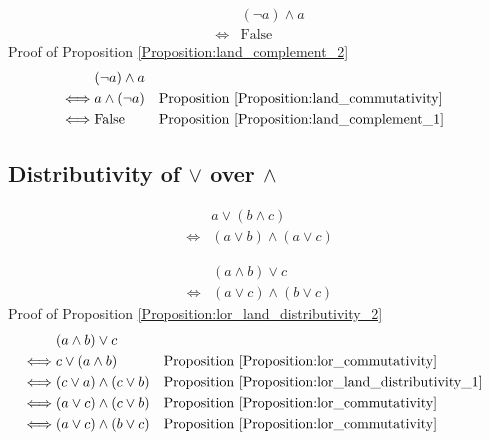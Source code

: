 \begin{prop}
\label{Proposition:land_complement_2}
\begin{align*}
& (\lnot a) \land a \\
\iff & \text{False}
\end{align*}
Proof of Proposition \ref{Proposition:land_complement_2}
\begin{align*}
& (\lnot a) \land a \\
\iff & a \land (\lnot a)
& & \text{Proposition \ref{Proposition:land_commutativity}} \\
\iff & \text{False}
& & \text{Proposition \ref{Proposition:land_complement_1}} \\
\end{align*}
\end{prop}

\subsection{Distributivity of $\lor$ over $\land$}
\begin{prop}
\label{Proposition:lor_land_distributivity_1}
\begin{align*}
& a \lor (b \land c) \\
\iff & (a \lor b) \land (a \lor c)
\end{align*}
\end{prop}

\begin{prop}
\label{Proposition:lor_land_distributivity_2}
\begin{align*}
& (a \land b) \lor c \\
\iff & (a \lor c) \land (b \lor c)
\end{align*}
Proof of Proposition \ref{Proposition:lor_land_distributivity_2}
\begin{align*}
& (a \land b) \lor c \\
\iff & c \lor (a \land b)
& & \text{Proposition \ref{Proposition:lor_commutativity}} \\
\iff & (c \lor a) \land (c \lor b)
& & \text{Proposition \ref{Proposition:lor_land_distributivity_1}} \\
\iff & (a \lor c) \land (c \lor b)
& & \text{Proposition \ref{Proposition:lor_commutativity}} \\
\iff & (a \lor c) \land (b \lor c)
& & \text{Proposition \ref{Proposition:lor_commutativity}} \\
\end{align*}
\end{prop}


